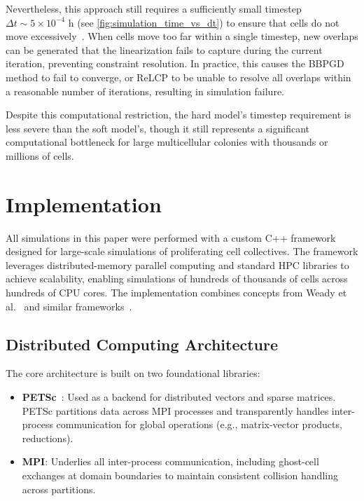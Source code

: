 \documentclass[conference]{IEEEtran}
\begin{document}
Nevertheless, this approach still requires a sufficiently small timestep $\Delta t \sim 5 \times 10^{-4}$ h (see \autoref{fig:simulation_time_vs_dt}) to ensure that cells do not move excessively~\cite{Yan2022}. When cells move too far within a single timestep, new overlaps can be generated that the linearization fails to capture during the current iteration, preventing constraint resolution. In practice, this causes the BBPGD method to fail to converge, or ReLCP to be unable to resolve all overlaps within a reasonable number of iterations, resulting in simulation failure.

Despite this computational restriction, the hard model's timestep requirement is less severe than the soft model's, though it still represents a significant computational bottleneck for large multicellular colonies with thousands or millions of cells.

\section{Implementation}

All simulations in this paper were performed with a custom C++ framework designed for large-scale simulations of proliferating cell collectives. The framework leverages distributed-memory parallel computing and standard HPC libraries to achieve scalability, enabling simulations of hundreds of thousands of cells across hundreds of CPU cores. The implementation combines concepts from Weady et al.~\cite{Weady2024SM} and similar frameworks~\cite{Tasora2008,Yan2019}.

\subsection{Distributed Computing Architecture}

The core architecture is built on two foundational libraries:
\begin{itemize}
    \item \textbf{PETSc}~\cite{petsc-web-page}: Used as a backend for distributed vectors and sparse matrices. PETSc partitions data across MPI processes and transparently handles inter-process communication for global operations (e.g., matrix-vector products, reductions).
    \item \textbf{MPI}: Underlies all inter-process communication, including ghost-cell exchanges at domain boundaries to maintain consistent collision handling across partitions.
\end{itemize}
\end{document}
